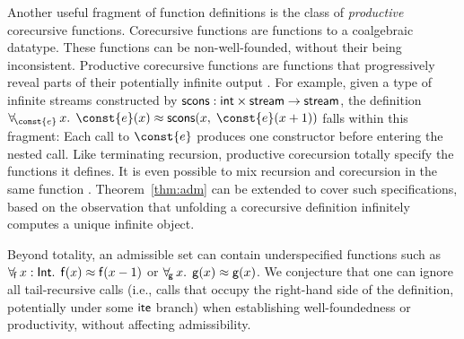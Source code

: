 \begin{longv}
Another useful fragment of function definitions is the class of
\emph{productive} corecursive functions. Corecursive functions are functions to
a coalgebraic datatype. These functions can be non-well-founded, without
their being inconsistent. Productive corecursive functions are functions that
progressively reveal parts of their potentially infinite
output \cite{turner-1995,mcbride-productive}.
For example, given a type of infinite streams constructed by
$\mathsf{scons} : \mathsf{int} \times \mathsf{stream} \to \mathsf{stream}$,
the definition
$\forallf{\const{e}} x.\;\, \const{e}(x) \teq \con{scons}(x,\; \const{e}(x + 1))$
falls within this fragment: Each call to $\const{e}$ produces one
constructor before entering the nested call. Like terminating recursion,
productive corecursion totally specify the functions it defines.
It is even possible to mix recursion and corecursion in the same function
\cite{blanchette-et-al-2015-fouco}. Theorem~\ref{thm:adm} can be extended to
cover such specifications, based on the observation that unfolding
a corecursive definition infinitely computes a unique infinite object.

Beyond totality, an admissible set can contain underspecified functions
such as $\forall_{\!\mathsf{f}\:} x : \mathsf{Int}.\allowbreak\;\, \mathsf{f}( x )
\approx \mathsf{f}( x - 1 )$ or $\forall_{\!\mathsf{g}\:} x.\allowbreak\;\, \mathsf{g}( x
) \approx \mathsf{g}( x )$. We conjecture that one can ignore all
tail-recursive calls (i.e., calls that occupy the right-hand side of the
definition, potentially under some $\mathsf{ite}$ branch) when establishing well-foundedness
or productivity, without affecting admissibility.
\end{longv}

\newcommand\badassex{
 \{\forallf{\con{f}} x : \typeint.\;\, \con{f}( x ) \teq \con{f}( x ),\allowbreak\;\,
 \forallf{\con{g}} x : \typeint.\;\, \con{g}( x ) \teq \con{g}( x ) + \nobreak\con{f}( x )\}}

